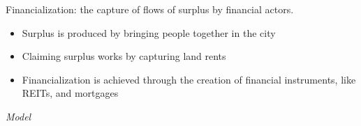 \documentclass[]{beamer} %
\begin{document}
\begin{frame}{Financialization: 
the capture of flows of surplus by financial actors.}
\begin{itemize} \Large 
    \item Surplus is produced by bringing people together in the city 
    \item Claiming surplus works by capturing land rents %
    \item Financialization is achieved through the creation of financial instruments, like REITs, and mortgages 
\end{itemize}

\end{frame}

\begin{frame}
\begin{figure}[!ht]
\centering
\resizebox{0.85\textwidth}{!}{}
\label{fig:fieldsplus}
\end{figure}
\end{frame}





\begin{frame}{}
  \centering \Huge
  \emph{Model}
  
  
\end{frame}
\end{document}
